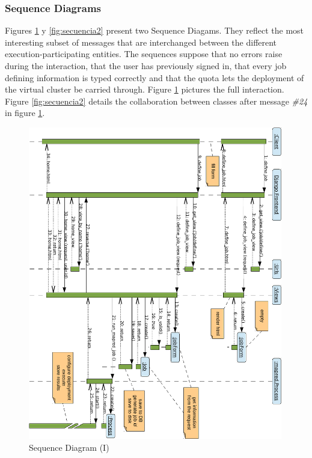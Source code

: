 \subsubsection{Sequence Diagrams}\label{subsubsec:secuencia}
\noindent Figures \ref{fig:secuencia1} y \ref{fig:secuencia2} present two Sequence Diagams. They reflect the most interesting subset of messages that are interchanged between the different execution-participating entities. The sequences suppose that no errors raise during the interaction, that the user has previously signed in, that every job defining information is typed correctly and that the quota lets the deployment of the virtual cluster be carried through. Figure \ref{fig:secuencia1} pictures the full interaction. Figure \ref{fig:secuencia2} details the collaboration between classes after message \emph{\#24} in figure \ref{fig:secuencia1}.

\begin{figure}[tbp]
\begin{center}
\includegraphics[width=0.99\textwidth]{imagenes/033.pdf}
 \caption{Sequence Diagram (I)}
\label{fig:secuencia1}
\end{center}
\end{figure}

